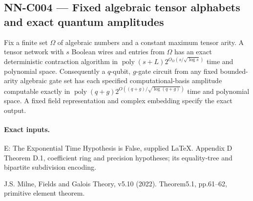 \subsection{NN-C004 --- Fixed algebraic tensor alphabets and exact quantum amplitudes}
\begin{proposition}[NN-C004]
Fix a finite set $\Omega$ of algebraic numbers and a constant maximum tensor arity. A tensor network with $s$ Boolean wires and entries from $\Omega$ has an exact deterministic contraction algorithm in $\operatorname{poly}(s+L)2^{O_\Omega(s/\sqrt{\log s})}$ time and polynomial space. Consequently a $q$-qubit, $g$-gate circuit from any fixed bounded-arity algebraic gate set has each specified computational-basis amplitude computable exactly in $\operatorname{poly}(q+g)2^{O((q+g)/\sqrt{\log(q+g)})}$ time and polynomial space. A fixed field representation and complex embedding specify the exact output.
\end{proposition}
\paragraph{Exact inputs.}
E: The Exponential Time Hypothesis is False, supplied LaTeX. Appendix D Theorem D.1, coefficient ring and precision hypotheses; its equality-tree and bipartite subdivision encoding.

J.S. Milne, Fields and Galois Theory, v5.10 (2022). Theorem5.1, pp.61--62, primitive element theorem.


